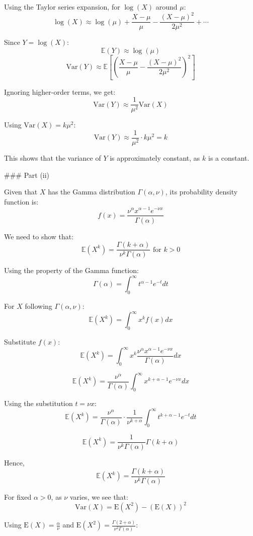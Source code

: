 Using the Taylor series expansion, for \( \log(X) \) around \( \mu \):
\[ \log(X) \approx \log(\mu) + \frac{X - \mu}{\mu} - \frac{(X - \mu)^2}{2\mu^2} + \cdots \]

Since \( Y = \log(X) \):
\[ \mathbb{E}(Y) \approx \log(\mu) \]
\[ \text{Var}(Y) \approx \mathbb{E}\left[\left(\frac{X - \mu}{\mu} - \frac{(X - \mu)^2}{2\mu^2}\right)^2\right] \]

Ignoring higher-order terms, we get:
\[ \text{Var}(Y) \approx \frac{1}{\mu^2}\text{Var}(X) \]

Using \( \text{Var}(X) = k\mu^2 \):
\[ \text{Var}(Y) \approx \frac{1}{\mu^2} \cdot k\mu^2 = k \]

This shows that the variance of \( Y \) is approximately constant, as \( k \) is a constant.

### Part (ii)

Given that \( X \) has the Gamma distribution \( \Gamma(\alpha, \nu) \), its probability density function is:
\[ f(x) = \frac{\nu^\alpha x^{\alpha-1} e^{-\nu x}}{\Gamma(\alpha)} \]

We need to show that:
\[ \mathbb{E}(X^k) = \frac{\Gamma(k + \alpha)}{\nu^k \Gamma(\alpha)} \text{ for } k > 0 \]

Using the property of the Gamma function:
\[ \Gamma(\alpha) = \int_0^\infty t^{\alpha-1} e^{-t} dt \]

For \( X \) following \( \Gamma(\alpha, \nu) \):
\[ \mathbb{E}(X^k) = \int_0^\infty x^k f(x) dx \]

Substitute \( f(x) \):
\[ \mathbb{E}(X^k) = \int_0^\infty x^k \frac{\nu^\alpha x^{\alpha-1} e^{-\nu x}}{\Gamma(\alpha)} dx \]

\[ \mathbb{E}(X^k) = \frac{\nu^\alpha}{\Gamma(\alpha)} \int_0^\infty x^{k+\alpha-1} e^{-\nu x} dx \]

Using the substitution \( t = \nu x \):
\[ \mathbb{E}(X^k) = \frac{\nu^\alpha}{\Gamma(\alpha)} \cdot \frac{1}{\nu^{k+\alpha}} \int_0^\infty t^{k+\alpha-1} e^{-t} dt \]

\[ \mathbb{E}(X^k) = \frac{1}{\nu^k \Gamma(\alpha)} \Gamma(k+\alpha) \]

Hence,
\[ \mathbb{E}(X^k) = \frac{\Gamma(k+\alpha)}{\nu^k \Gamma(\alpha)} \]

For fixed \( \alpha > 0 \), as \( \nu \) varies, we see that:
\[ \text{Var}(X) = \text{E}(X^2) - (\text{E}(X))^2 \]

Using \( \text{E}(X) = \frac{\alpha}{\nu} \) and \( \text{E}(X^2) = \frac{\Gamma(2 + \alpha)}{\nu^2 \Gamma(\alpha)} \):

